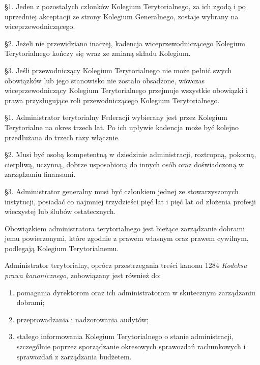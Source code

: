  \S{}1. Jeden z pozostałych członków Kolegium Terytorialnego, za ich zgodą i po uprzedniej akceptacji ze strony Kolegium Generalnego, zostaje wybrany na wiceprzewodniczącego.

\S{}2. Jeżeli nie przewidziano inaczej, kadencja wiceprzewodniczącego Kolegium Terytorialnego kończy się wraz ze zmianą składu Kolegium.

\S{}3. Jeśli przewodniczący Kolegium Terytorialnego nie może pełnić swych obowiązków lub jego stanowisko nie zostało obsadzone, wówczas wiceprzewodniczący Kolegium Terytorialnego przejmuje wszystkie obowiązki i prawa przysługujące roli przewodniczącego Kolegium Terytorialnego.


 \S{}1. Administrator terytorialny Federacji wybierany jest przez Kolegium Terytorialne na okres trzech lat. Po ich upływie kadencja może być kolejno przedłużana do trzech razy włącznie.

\S{}2. Musi być osobą kompetentną w dziedzinie administracji, roztropną, pokorną, cierpliwą, uczynną, dobrze usposobioną do innych osób oraz doświadczoną w zarządzaniu finansami.

\S{}3. Administrator generalny musi być członkiem jednej ze stowarzyszonych instytucji, posiadać co najmniej trzydzieści pięć lat i pięć lat od złożenia profesji wieczystej lub ślubów ostatecznych.


 Obowiązkiem administratora terytorialnego jest bieżące zarządzanie dobrami jemu powierzonymi, które zgodnie z prawem własnym oraz prawem cywilnym, podlegają Kolegium Terytorialnemu.

 Administrator terytorialny, oprócz przestrzegania treści kanonu 1284 {\em Kodeksu prawa kanonicznego}, zobowiązany jest również do:
\begin{enumerate}
	
	\item pomagania dyrektorom oraz ich administratorom w skutecznym zarządzaniu dobrami;
	
	\item przeprowadzania i nadzorowania audytów;
	
	\item stałego informowania Kolegium Terytorialnego o stanie administracji, szczególnie poprzez sporządzanie okresowych sprawozdań rachunkowych i sprawozdań z zarządzania budżetem.
\end{enumerate}

